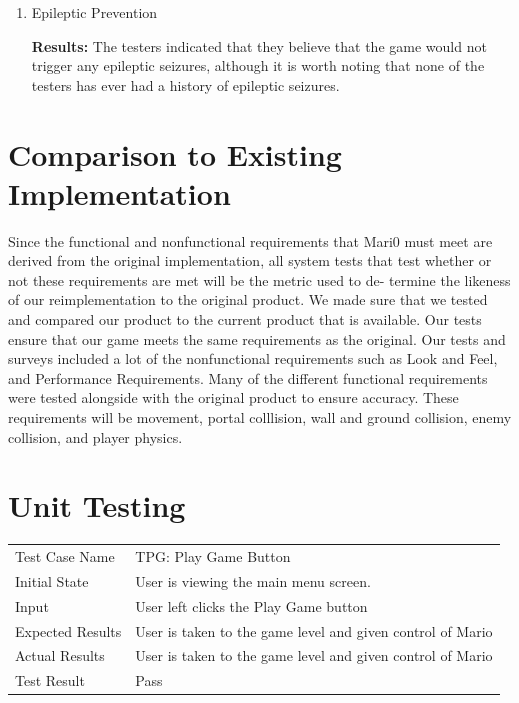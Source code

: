 \documentclass[12pt, titlepage]{article}
\begin{document}
\begin{enumerate}

\item{Epileptic Prevention\\}

\textbf{Results: }The testers indicated that they believe that the game would not trigger any epileptic seizures, although it is worth noting that none of the testers has ever had a history of epileptic seizures.

\end{enumerate}
	
\section{Comparison to Existing Implementation}	

Since the functional and nonfunctional requirements that Mari0 must meet
are derived from the original implementation, all system tests that test
whether or not these requirements are met will be the metric used to de-
termine the likeness of our reimplementation to the original product. We made
 sure that we tested and compared our product to the current product
that is available. Our tests ensure that our game meets the same requirements
as the original. Our tests and surveys included a lot of the nonfunctional requirements 
such as Look and Feel, and Performance Requirements. Many of the
different functional requirements were tested alongside with the original 
product to ensure accuracy. These requirements will be movement, portal
colllision, wall and ground collision, enemy collision, and player physics.

\section{Unit Testing}

\begin{center}
\begin{tabular}{ | l | p{10cm} | }
\hline
Test Case Name &  TPG: Play Game Button	\\
Initial State &  User is viewing the main menu screen.	\\
Input & User left clicks the Play Game button	\\
Expected Results & User is taken to the game level and given control of Mario	\\
Actual Results &  User is taken to the game level and given control of Mario	\\
Test Result & Pass	\\
\hline
\end{tabular}
\end{center}
\end{document}
